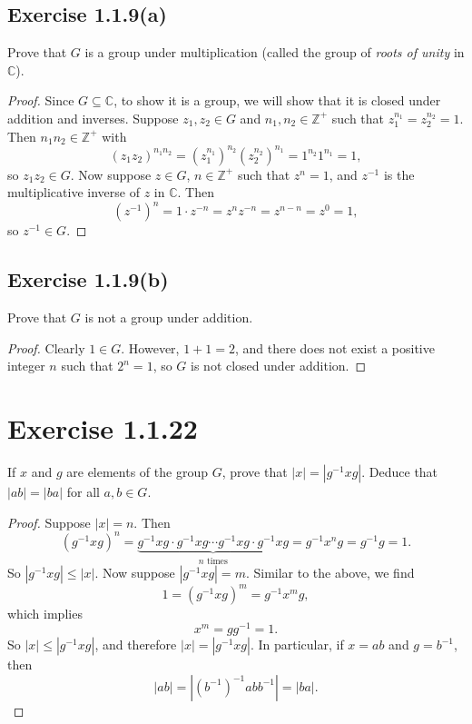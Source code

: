 \documentclass[12pt]{article}
\newenvironment{problem}
    {\begin{lrbox}{\mybox}\begin{minipage}{\textwidth-10pt}}
    {\end{minipage}\end{lrbox}\framebox[6.5in]{\usebox{\mybox}}}
\newcommand{\Z}{\mathbb{Z}}
\newcommand{\C}{\mathbb{C}}
\begin{document}
\subsection*{Exercise 1.1.9(a)}
\begin{problem}
    Prove that $G$ is a group under multiplication (called the group of \emph{roots of unity} in $\C$).
\end{problem}

\begin{proof}
    Since $G\subseteq \C$, to show it is a group, we will show that it is closed under addition and inverses. Suppose $z_1,z_2\in G$ and $n_1,n_2\in\Z^+$ such that $z_1^{n_1}=z_2^{n_2}=1$. Then $n_1n_2\in\Z^+$ with
    \[(z_1z_2)^{n_1n_2} = (z_1^{n_1})^{n_2}(z_2^{n_2})^{n_1} = 1^{n_2}1^{n_1} = 1,\]
    so $z_1z_2\in G$. Now suppose $z\in G$, $n\in\Z^+$ such that $z^n=1$, and $z^{-1}$ is the multiplicative inverse of $z$ in $\C$. Then
    \[(z^{-1})^n = 1\cdot z^{-n} = z^nz^{-n} = z^{n-n} = z^0 = 1,\]
    so $z^{-1}\in G$. 
    
\end{proof}

\subsection*{Exercise 1.1.9(b)}
\begin{problem}
    Prove that $G$ is not a group under addition.
\end{problem}

\begin{proof}
    Clearly $1\in G$. However, $1+1=2$, and there does not exist a positive integer $n$ such that $2^n=1$, so $G$ is not closed under addition.
    
\end{proof}

\section*{Exercise 1.1.22}
\begin{problem}
    If $x$ and $g$ are elements of the group $G$, prove that $|x|=|g^{-1}xg|$. Deduce that $|ab|=|ba|$ for all $a,b\in G$.
\end{problem}

\begin{proof}
    Suppose $|x|=n$. Then
    \[(g^{-1}xg)^n = \underbrace {g^{-1}xg \cdot g^{-1}xg \cdots g^{-1}xg \cdot g^{-1}xg}_{n \text{ times}} = g^{-1}x^ng = g^{-1}g = 1.\]
    So $|g^{-1}xg|\leq |x|$. Now suppose $|g^{-1}xg|=m$. Similar to the above, we find
    \[1 = (g^{-1}xg)^m = g^{-1}x^mg,\]
    which implies
    \[x^m = gg^{-1} = 1.\]
    So $|x|\leq|g^{-1}xg|$, and therefore $|x|=|g^{-1}xg|$. In particular, if $x=ab$ and $g=b^{-1}$, then
    \[|ab| = |(b^{-1})^{-1}abb^{-1}| = |ba|.\]
\end{proof}
\end{document}
